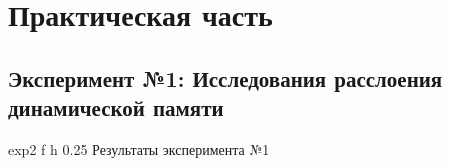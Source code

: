 \chapter{Практическая часть}

\section{Эксперимент №1: Исследования расслоения динамической памяти}

{exp2} %
{f} %
{h} %
{0.25\textwidth} %
{Результаты эксперимента №1} %


